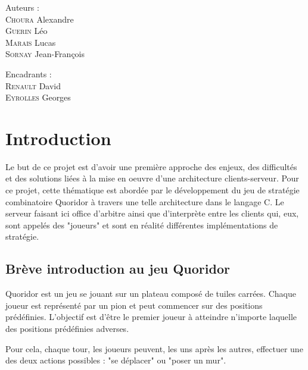 \documentclass[11pt]{article}
\begin{document}
\begin{titlepage}
\begin{minipage}[b]{0.40\linewidth}
        \flushleft 
        \large
        Auteurs : 
        \\
        \textsc{Choura} Alexandre
        \\
        \textsc{Guerin} Léo
        \\
        \textsc{Marais} Lucas
        \\
        \textsc{Sornay} Jean-François
    \end{minipage} \hfill
    \begin{minipage}[b]{0.40\linewidth}
        \flushright 
        \large 
        Encadrants : 
        \\
        \textsc{Renault} David
        \\
        \textsc{Eyrolles} Georges
    \end{minipage} \hfill

\end{titlepage}

\newpage

\tableofcontents

\newpage

\section{Introduction}
Le but de ce projet est d'avoir une première approche des enjeux, des difficultés et des solutions liées à la mise en oeuvre d'une architecture clients-serveur.
Pour ce projet, cette thématique est abordée par le développement du jeu de stratégie combinatoire Quoridor à travers une telle architecture dans le langage C.
Le serveur faisant ici office d'arbitre ainsi que d'interprète entre les clients qui, eux, sont appelés des "joueurs" et sont en réalité différentes implémentations de stratégie.

\subsection{Brève introduction au jeu Quoridor}
Quoridor est un jeu se jouant sur un plateau composé de tuiles carrées. Chaque joueur est représenté par un pion et peut commencer sur des positions prédéfinies. L'objectif est d'être le premier joueur à atteindre n'importe laquelle des positions prédéfinies adverses.

\vspace{4mm}

Pour cela, chaque tour, les joueurs peuvent, les uns après les autres, effectuer une des deux actions possibles : "se déplacer" ou "poser un mur".
\end{document}
